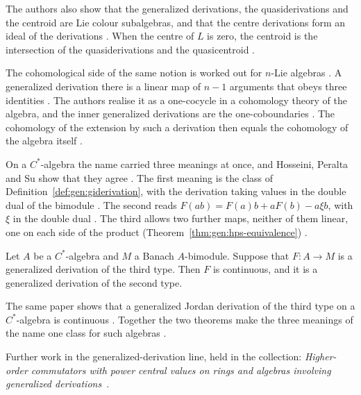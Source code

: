 The authors also show that the generalized derivations, the quasiderivations and
the centroid are Lie colour subalgebras, and that the centre derivations form an
ideal of the derivations \cite[Proposition~2.1, p.~926]{ChenMaNi2013}. When the
centre of $L$ is zero, the centroid is the intersection of the quasiderivations and
the quasicentroid \cite[Theorem~2.6, p.~929]{ChenMaNi2013}.

The cohomological side of the same notion is worked out for $n$-Lie algebras
\cite[p.~1]{AtesliEsenSutlu2021}. A generalized derivation there is a linear
map of $n-1$ arguments that obeys three identities
\cite[p.~7]{AtesliEsenSutlu2021}. The authors realise it as a one-cocycle in a
cohomology theory of the algebra, and the inner generalized derivations are the
one-coboundaries \cite[p.~3]{AtesliEsenSutlu2021}. The cohomology of the
extension by such a derivation then equals the cohomology of the algebra itself
\cite[Corollary~3.2, p.~27]{AtesliEsenSutlu2021}.

On a $C^{*}$-algebra the name carried three meanings at once, and
Hosseini, Peralta and Su show that they agree
\cite[p.~1]{HosseiniPeraltaSu2025}. The first meaning is the class of
Definition~\ref{def:gen:giderivation}, with the derivation taking values in the
double dual of the bimodule \cite[p.~1]{HosseiniPeraltaSu2025}. The second reads
$F(ab)=F(a)b+aF(b)-a\xi b$, with $\xi$ in the double dual
\cite[p.~2]{HosseiniPeraltaSu2025}. The third allows two further maps, neither of
them linear, one on each side of the product (Theorem~\ref{thm:gen:hps-equivalence})
\cite[Definition~1.1, p.~3]{HosseiniPeraltaSu2025}.\begin{theorem}\label{thm:gen:hps-equivalence}
Let $A$ be a $C^{*}$-algebra and $M$ a Banach $A$-bimodule. Suppose that
$F\colon A\to M$ is a generalized derivation of the third type. Then $F$ is
continuous, and it is a generalized derivation of the second type.
\end{theorem}

The same paper shows that a generalized Jordan derivation of the third type on a
$C^{*}$-algebra is continuous \cite[Theorem~3.1, p.~13]{HosseiniPeraltaSu2025}.
Together the two theorems make the three meanings of the name one class for such
algebras \cite[p.~1]{HosseiniPeraltaSu2025}.

Further work in the generalized-derivation line, held in the collection:
\noindent\emph{Higher-order commutators with power central values on rings and algebras involving generalized derivations}~\cite{LibHigherOrderCommutatorsWith2021}.

